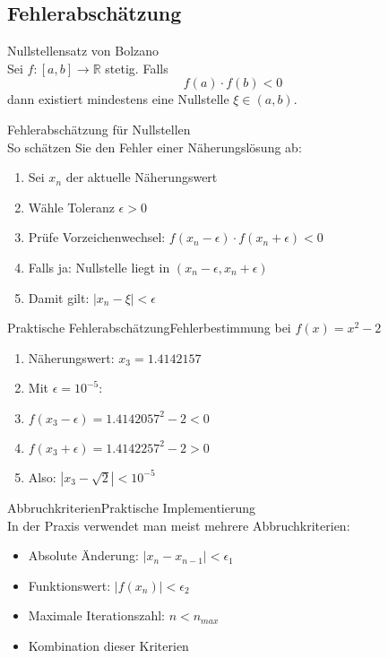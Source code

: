 \subsection{Fehlerabschätzung}

\begin{lemma}{Nullstellensatz von Bolzano}\\
Sei $f:[a,b] \rightarrow \mathbb{R}$ stetig. Falls 
$$f(a) \cdot f(b) < 0$$ 
dann existiert mindestens eine Nullstelle $\xi \in (a,b)$.
\end{lemma}

\begin{KR}{Fehlerabschätzung für Nullstellen}\\
So schätzen Sie den Fehler einer Näherungslösung ab:
\begin{enumerate}
    \item Sei $x_n$ der aktuelle Näherungswert
    \item Wähle Toleranz $\epsilon > 0$
    \item Prüfe Vorzeichenwechsel: $f(x_n-\epsilon) \cdot f(x_n+\epsilon) < 0$
    \item Falls ja: Nullstelle liegt in $(x_n-\epsilon, x_n+\epsilon)$
    \item Damit gilt: $|x_n-\xi| < \epsilon$
\end{enumerate}
\end{KR}

\begin{example2}{Praktische Fehlerabschätzung}{Fehlerbestimmung bei $f(x)=x^2-2$}
\begin{enumerate}
    \item Näherungswert: $x_3 = 1.4142157$
    \item Mit $\epsilon = 10^{-5}$:
    \item $f(x_3-\epsilon) = 1.4142057^2 - 2 < 0$
    \item $f(x_3+\epsilon) = 1.4142257^2 - 2 > 0$
    \item Also: $|x_3-\sqrt{2}| < 10^{-5}$
\end{enumerate}
\end{example2}

\begin{remark2}{Abbruchkriterien}{Praktische Implementierung}\\
In der Praxis verwendet man meist mehrere Abbruchkriterien:
\begin{itemize}
    \item Absolute Änderung: $|x_n - x_{n-1}| < \epsilon_1$
    \item Funktionswert: $|f(x_n)| < \epsilon_2$
    \item Maximale Iterationszahl: $n < n_{max}$
    \item Kombination dieser Kriterien
\end{itemize}
\end{remark2}

